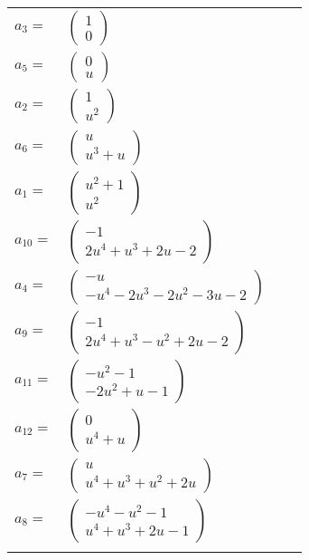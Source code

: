 \documentclass[1p]{elsarticle_modified}
\theoremstyle{definition}
\begin{document}
\begin{tabular}{m{7pt} m{180pt} m{7pt} m{180pt} }
\flushright $a_{3}=$&$\begin{pmatrix}1\\0\end{pmatrix}$ \\
\flushright $a_{5}=$&$\begin{pmatrix}0\\u\end{pmatrix}$ \\
\flushright $a_{2}=$&$\begin{pmatrix}1\\u^2\end{pmatrix}$ \\
\flushright $a_{6}=$&$\begin{pmatrix}u\\u^3+u\end{pmatrix}$ \\
\flushright $a_{1}=$&$\begin{pmatrix}u^2+1\\u^2\end{pmatrix}$ \\
\flushright $a_{10}=$&$\begin{pmatrix}-1\\2 u^4+u^3+2 u-2\end{pmatrix}$ \\
\flushright $a_{4}=$&$\begin{pmatrix}- u\\- u^4-2 u^3-2 u^2-3 u-2\end{pmatrix}$ \\
\flushright $a_{9}=$&$\begin{pmatrix}-1\\2 u^4+u^3- u^2+2 u-2\end{pmatrix}$ \\
\flushright $a_{11}=$&$\begin{pmatrix}- u^2-1\\-2 u^2+u-1\end{pmatrix}$ \\
\flushright $a_{12}=$&$\begin{pmatrix}0\\u^4+u\end{pmatrix}$ \\
\flushright $a_{7}=$&$\begin{pmatrix}u\\u^4+u^3+u^2+2 u\end{pmatrix}$ \\
\flushright $a_{8}=$&$\begin{pmatrix}- u^4- u^2-1\\u^4+u^3+2 u-1\end{pmatrix}$\\&\end{tabular}
\end{document}
